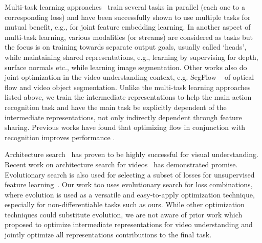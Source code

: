 \documentclass[final]{cvpr}
\begin{document}
Multi-task learning approaches~\cite{doersch2017multi,ren2018cross,zamir2018taskonomy,kendall2018multi,hsu2018unsupervised,munro2020multimodal} train several tasks in parallel (each one to a corresponding loss) and have been successfully shown to use  multiple tasks for mutual benefit, e.g., for joint feature embedding learning. In another aspect of multi-task learning, various modalities (or streams) are considered as tasks but the focus is on training towards separate output goals, usually called `heads', while maintaining shared representations, e.g., learning by supervising for depth, surface normals etc., while learning image segmentation.
Other works also do joint optimization in the video understanding context, e.g. 
SegFlow ~\cite{cheng2017segflow} of optical flow and video object segmentation.
Unlike the multi-task learning approaches listed above, we train the intermediate representations to help the main action recognition task and have the main task be explicitly dependent of the intermediate representations, not only indirectly dependent through feature sharing. Previous works have found that optimizing flow in conjunction with recognition improves performance \cite{ng2018actionflownet,fan2018end}.




Architecture search~\cite{zoph2017neural,zoph2018nas,liu2018progressive,bender2018understanding,liu2019darts,real2019amoeba,hu2019efficient} has proven to be highly successful for visual understanding. 
Recent work on architecture search for videos~\cite{nekrasov2019architecture,piergiovanni2018evolving} has demonstrated promise. Evolutionary search is also used for selecting a subset of losses for unsupervised feature learning~\cite{piergiovanni2020evolving}.
Our work too uses evolutionary search for loss combinations, where evolution is used as a versatile and easy-to-apply optimization technique, especially for non-differentiable tasks such as ours. While other optimization techniques could substitute evolution, 
we are not aware of prior work which proposed to optimize intermediate representations for video understanding and jointly optimize all representations contributions to the final task.
\end{document}
